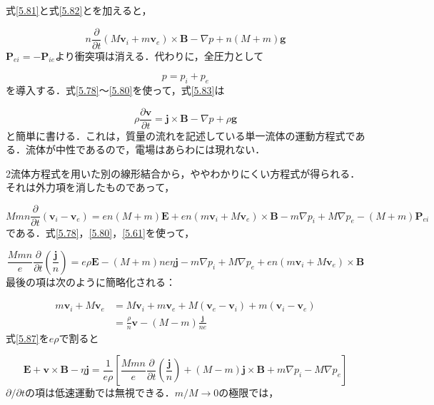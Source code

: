 \documentclass{ltjsarticle}
\numberwithin{equation}{section} %
\begin{document}
式\eqref{5.81}と式\eqref{5.82}とを加えると，

\begin{equation}
  n\frac{\partial}{\partial t}(M\bm{v}_i + m\bm{v}_e) \times \bm{B} - \nabla p + n(M+m)\bm{g} \label{5.83}
\end{equation}
$\bm{P}_{ei} = -\bm{P}_{ie}$より衝突項は消える．代わりに，全圧力として

\begin{equation}
  p = p_i + p_e \label{5.84}
\end{equation}
を導入する．式\eqref{5.78}～\eqref{5.80}を使って，式\eqref{5.83}は

\begin{equation}
  \rho\frac{\partial \bm{v}}{\partial t} = \bm{j}\times \bm{B} - \nabla p + \rho \bm{g} \label{5.85}
\end{equation}
と簡単に書ける．これは，質量の流れを記述している単一流体の運動方程式である．流体が中性であるので，電場はあらわには現れない．

2流体方程式を用いた別の線形結合から，ややわかりにくい方程式が得られる．それは外力項を消したものであって，

\begin{equation}
  Mmn\frac{\partial}{\partial t}(\bm{v}_i - \bm{v}_e) = en(M+m)\bm{E} + en(m\bm{v}_i + M\bm{v}_e) \times \bm{B} - m\nabla p_i + M\nabla p_e - (M+m)\bm{P}_{ei} \label{5.86}
\end{equation}
である．式\eqref{5.78}，\eqref{5.80}，\eqref{5.61}を使って，

\begin{equation}
  \frac{Mmn}{e}\frac{\partial}{\partial t}\left(\frac{\bm{j}}{n}\right) = e\rho \bm{E} - (M+m)ne\eta \bm{j} - m\nabla p_i + M\nabla p_e + en(m\bm{v}_i+M\bm{v}_e)\times \bm{B} \label{5.87}
\end{equation}
最後の項は次のように簡略化される：

\begin{equation}
  \begin{aligned}
    m\bm{v}_i + M\bm{v}_e &= M\bm{v}_i + m\bm{v}_e + M(\bm{v}_e - \bm{v}_i) + m(\bm{v}_i - \bm{v}_e)\\
                          &= \frac{\rho}{n}\bm{v} - (M-m)\frac{\bm{j}}{ne}
  \end{aligned} \label{5.88}
\end{equation}
式\eqref{5.87}を$e\rho$で割ると

\begin{equation}
  \bm{E} + \bm{v}\times \bm{B} - \eta \bm{j} = \frac{1}{e\rho}\left[\frac{Mmn}{e}\frac{\partial}{\partial t}\left(\frac{\bm{j}}{n}\right) + (M-m)\bm{j}\times \bm{B} + m\nabla p_i - M\nabla p_e\right] \label{5.89}
\end{equation}
$\partial/\partial t$の項は低速運動では無視できる．$m/M \rightarrow 0$の極限では，
\end{document}
